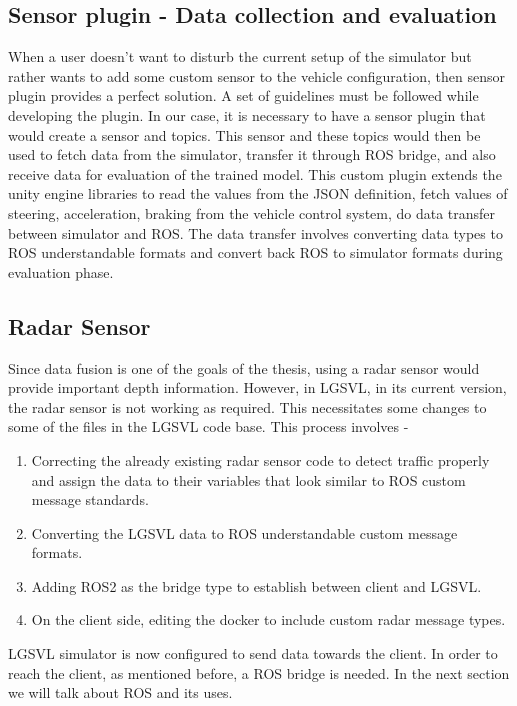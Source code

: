 \subsection{Sensor plugin - Data collection and evaluation}
When a user doesn't want to disturb the current setup of the simulator but rather wants to add
some custom sensor to the vehicle configuration, then sensor plugin provides a perfect
solution. A set of guidelines must be followed while developing the plugin. In our case,
it is necessary to have a sensor plugin that would create a sensor and topics. This sensor
and these topics would then be used to fetch data from the simulator, transfer it through ROS bridge, and also receive
data for evaluation of the trained model. This custom plugin
extends the unity engine libraries to read the values from the JSON definition, fetch
values of steering, acceleration, braking from the vehicle control system, do
data transfer between simulator and ROS. The data transfer involves converting data types
to ROS understandable formats and convert back ROS to simulator formats during evaluation
phase.

\subsection{Radar Sensor}
Since data fusion is one of the goals of the thesis, using a radar sensor would provide
important depth information. However, in LGSVL, in its current version, the radar sensor is not working as
required. This necessitates some changes to some of the files in the LGSVL code base.
This process involves -
\begin{enumerate}
    \item Correcting the already existing radar sensor code to detect traffic properly and
        assign the data to their variables that look similar to ROS custom message standards.
    \item Converting the LGSVL data to ROS understandable  custom message formats.
    \item Adding ROS2 as the bridge type to establish between client and LGSVL.
    \item On the client side, editing the docker to include custom radar message types.
\end{enumerate}

LGSVL simulator is now configured to send data towards the client. In order to reach the
client, as mentioned before, a ROS bridge is needed. In the next section we will talk
about ROS and its uses.

